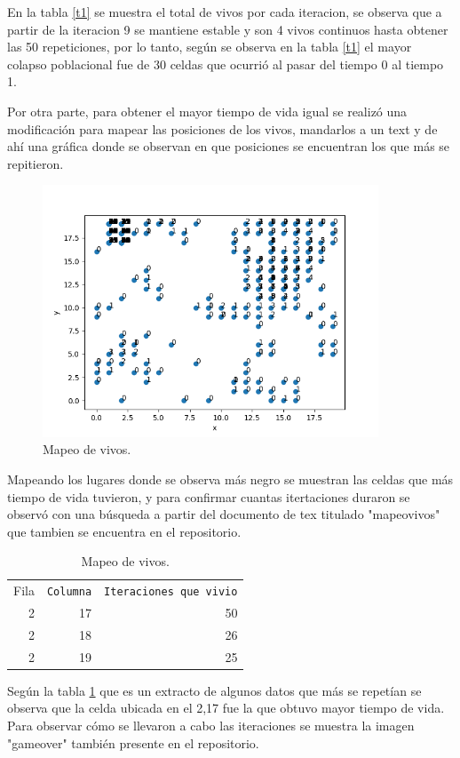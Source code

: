 \documentclass{article}
\begin{document}
En la tabla \ref{t1} se muestra el total de vivos por cada iteracion, se observa que a partir de la iteracion 9 se mantiene estable y son 4 vivos continuos hasta obtener las 50 repeticiones, por lo tanto, seg\'un se observa en la tabla \ref{t1} el mayor colapso poblacional fue de 30 celdas que ocurri\'o al pasar del tiempo 0 al tiempo 1.

Por otra parte, para obtener el mayor tiempo de vida igual se realiz\'o una modificaci\'on para mapear las posiciones de los vivos, mandarlos a un text y de ah\'i una gr\'afica donde se observan en que posiciones se encuentran los que m\'as se repitieron.

\begin{figure}
  \begin{center}
    \includegraphics[width=10cm]{posiciones.png}
  \end{center}
  \caption{Mapeo de vivos.}
  \label{f1}
\end{figure}

Mapeando los lugares donde se observa m\'as negro se muestran las celdas que m\'as tiempo de vida tuvieron, y para confirmar cuantas itertaciones duraron se observ\'o con una b\'usqueda a partir del documento de tex \cite{ana} titulado "mapeovivos" que tambien se encuentra en el repositorio.

\begin{table}
  \caption{Mapeo de vivos.}
  \label{t2}
  \begin{center}
    \begin{tabular}{rrr}
      Fila & \texttt{Columna} & \texttt{Iteraciones que vivio} \\
      2 &  17    & 50     \\
      2  &  18   &  26    \\
      2  &  19    & 25   
    \end{tabular}
    \end{center}
  \end{table}
Seg\'un la tabla \ref{t2} que es un extracto de algunos datos que m\'as se repet\'ian se observa que la celda ubicada en el 2,17 fue la que obtuvo mayor tiempo de vida.
Para observar c\'omo se llevaron a cabo las iteraciones se muestra la imagen \cite{ana} "gameover" tambi\'en presente en el repositorio.
\end{document}
